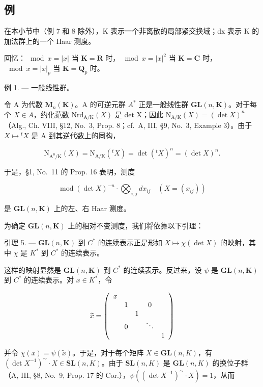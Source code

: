 \subsection{例}

在本小节中（例 7 和 8 除外），K 表示一个非离散的局部紧交换域；dx 表示 K 的加法群上的一个 Haar 测度。

回忆：\(\mod x = |x|\) 当 \(\mathbf{K} = \mathbf{R}\) 时，\(\mod x = |x|^2\) 当 \(\mathbf{K} = \mathbf{C}\) 时，\(\mod x = |x|_p\) 当 \(\mathbf{K} = \mathbf{Q}_p\) 时。

例 1. --- 一般线性群。

令 A 为代数 \(\mathbf{M}_{n}(\mathbf{K})\)。A 的可逆元群 \(A^{*}\) 正是一般线性群 \(\mathbf{GL}(n,\mathbf{K})\)。对于每个 \(X\in A\)，约化范数 \(\mathrm{Nrd}_{\mathrm{A}/\mathrm{K}}(X)\) 是 det X；因此 \(\mathrm{N}_{\mathrm{A}/\mathrm{K}}(X)=(\det X)^{n}\)（Alg., Ch. VIII, §12, No.~3, Prop. 8；cf.~A, III, §9, No.~3, Example 3）。由于 \(X\mapsto{}^{t}X\) 是 A 到其逆代数上的同构，

\[
\mathrm{N} _ {\mathrm{A} ^ {0} / \mathrm{K}} (X) = \mathrm{N} _ {\mathrm{A} / \mathrm{K}} (^ {t} X) = \det (^ {t} X) ^ {n} = (\det X) ^ {n}.
\]

于是，§1, No.~11 的 Prop. 16 表明，测度

\[
\operatorname{mod} (\det X) ^ {- n} \cdot \bigotimes_ {i, j} d x _ {i j} \quad (X = (x _ {i j}))\tag{3}
\]

是 \(\mathbf{GL}(n,\mathbf{K})\) 上的左、右 Haar 测度。

为确定 \(\mathbf{GL}(n,\mathbf{K})\) 上的相对不变测度，我们将依靠以下引理：

引理 5. --- \(\mathbf{GL}(n,\mathbf{K})\) 到 \(C^{*}\) 的连续表示正是形如 \(X \mapsto \chi(\det X)\) 的映射，其中 \(\chi\) 是 \(K^{*}\) 到 \(C^{*}\) 的连续表示。

这样的映射显然是 \(\mathbf{GL}(n,\mathbf{K})\) 到 \(C^{*}\) 的连续表示。反过来，设 \(\psi\) 是 \(\mathbf{GL}(n,\mathbf{K})\) 到 \(C^{*}\) 的连续表示。对 \(x \in K^{*}\)，令

\[
\widetilde {x} = \left( \begin{array}{c c c c c} x & & & & \\ & 1 & & 0 & \\ & & 1 & & \\ & 0 & & \ddots & \\ & & & & 1 \end{array} \right)
\]

并令 \(\chi(x) = \psi(\widetilde{x})\)。于是，对于每个矩阵 \(X \in \mathbf{GL}(n, K)\)，有 \((\det X^{-1})^{\sim} \cdot X \in \mathbf{SL}(n, K)\)。由于 \(\mathbf{SL}(n, K)\) 是 \(\mathbf{GL}(n, K)\) 的换位子群（A, III, §8, No.~9, Prop. 17 的 Cor.），\(\psi((\det X^{-1})^{\sim} \cdot X) = 1\)，从而

